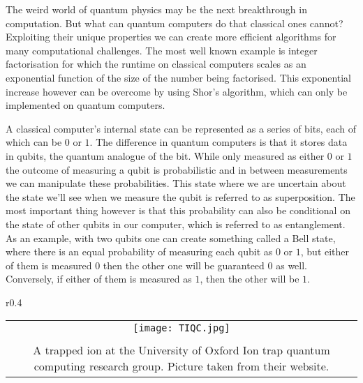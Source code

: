 \documentclass[12pt,twoside]{report}
\date{May 2022}
\begin{document}




\clearpage{\pagestyle{empty}\cleardoublepage}
\setcounter{page}{1}
\pagestyle{fancy}


{%
\vspace*{-2.em}
The weird world of quantum physics may be the next breakthrough in computation. But what can quantum computers do that classical ones cannot? Exploiting their unique properties we can create more efficient algorithms for many computational challenges. The most well known example is integer factorisation for which the runtime on classical computers scales as an exponential function of the size of the number being factorised. This exponential increase however can be overcome by using Shor's algorithm, which can only be implemented on quantum computers.

A classical computer's internal state can be represented as a series of bits, each of which can be $0$ or $1$. The difference in quantum computers is that it stores data in qubits, the quantum analogue of the bit. While only measured as either $0$ or $1$ the outcome of measuring a qubit is probabilistic and in between measurements we can manipulate these probabilities. This state where we are uncertain about the state we'll see when we measure the qubit is referred to as superposition. The most important thing however is that this probability can also be conditional on the state of other qubits in our computer, which is referred to as entanglement. As an example, with two qubits one can create something called a Bell state, where there is an equal probability of measuring each qubit as $0$ or $1$, but either of them is measured $0$ then the other one will be guaranteed $0$ as well. Conversely, if either of them is measured as $1$, then the other will be $1$.

\begin{wrapfigure}{r}{0.4\linewidth}
	\centering
		\vspace*{-0.75em}
		\hspace*{-0.5em}
		\begin{tabular}{c}
			\texttt{[image: TIQC.jpg]}\\
			\vspace*{-.5em}\\
			\parbox{\linewidth}{\centering\footnotesize A trapped ion at the University of Oxford Ion trap quantum computing research group. Picture taken from their website\footnotemark.}
		\end{tabular}
	\vspace*{-0.75em}
\end{wrapfigure}

}
\end{document}
